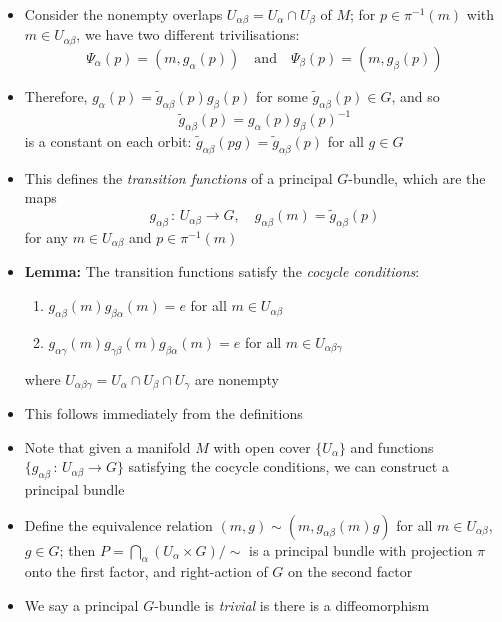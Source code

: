\documentclass[12pt,a4paper]{article}
\numberwithin{equation}{section}
\begin{document}
\begin{itemize}
		\item Consider the nonempty overlaps $U_{\alpha\beta}=U_{\alpha}\cap U_{\beta}$ of $M$; for $p\in\pi^{-1}(m)$ with $m\in U_{\alpha\beta}$, we have two different trivilisations:
		\begin{equation}
			\Psi_{\alpha}(p)=(m,g_{\alpha}(p))\quad\text{and}\quad \Psi_{\beta}(p)=(m,g_{\beta}(p))
		\end{equation} 
		\item Therefore, $g_{\alpha}(p)=\tilde{g}_{\alpha\beta}(p)g_{\beta}(p)$ for some $\tilde{g}_{\alpha\beta}(p)\in G$, and so
		\begin{equation}
			\tilde{g}_{\alpha\beta}(p)=g_{\alpha}(p)g_{\beta}(p)^{-1}
		\end{equation}
		is a constant on each orbit: $\tilde{g}_{\alpha\beta}(pg)=\tilde{g}_{\alpha\beta}(p)$ for all $g\in G$
		\item This defines the \textit{transition functions} of a principal $G$-bundle, which are the maps
		\begin{equation}
			g_{\alpha\beta}\,:\,U_{\alpha\beta}\to G,\quad g_{\alpha\beta}(m)=\tilde{g}_{\alpha\beta}(p)
		\end{equation}
		for any $m\in U_{\alpha\beta}$ and $p\in \pi^{-1}(m)$
		\item \textbf{Lemma:} The transition functions satisfy the \textit{cocycle conditions}:
		\begin{enumerate}
			\item $g_{\alpha\beta}(m)g_{\beta\alpha}(m)=e$ for all $m\in U_{\alpha\beta}$
			\item $g_{\alpha\gamma}(m)g_{\gamma\beta}(m)g_{\beta\alpha}(m)=e$ for all $m\in U_{\alpha\beta\gamma}$
		\end{enumerate}
		where $U_{\alpha\beta\gamma}=U_{\alpha}\cap U_{\beta}\cap U_{\gamma}$ are nonempty
		\item This follows immediately from the definitions
		\item Note that given a manifold $M$ with open cover $\{U_{\alpha}\}$ and functions $\{g_{\alpha\beta}\,:\,U_{\alpha\beta}\to G\}$ satisfying the cocycle conditions, we can construct a principal bundle
		\item Define the equivalence relation $(m,g)\sim(m,g_{\alpha\beta}(m)g)$ for all $m\in U_{\alpha\beta}$, $g\in G$; then $P=\bigcap_{\alpha}(U_{\alpha}\times G)/\sim$ is a principal bundle with projection $\pi$ onto the first factor, and right-action of $G$ on the second factor
		\item We say a principal $G$-bundle is \textit{trivial} is there is a diffeomorphism

\end{itemize}
\end{document}
